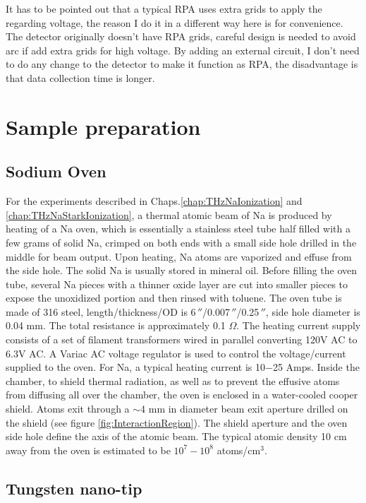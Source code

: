 It has to be pointed out that a typical RPA uses extra grids to apply the regarding voltage, the reason I do it in a different way here is for convenience. The detector originally doesn't have RPA grids, careful design is needed to avoid arc if add extra grids for high voltage. By adding an external circuit, I don't need to do any change to the detector to make it function as RPA, the disadvantage is that data collection time is longer. 

\section{Sample preparation}

\subsection{Sodium Oven}

For the experiments described in Chaps.\@ \ref{chap:THzNaIonization} and \ref{chap:THzNaStarkIonization}, a thermal atomic beam of Na is produced by heating of a Na oven, which is essentially a stainless steel tube half filled with a few grams of solid Na, crimped on both ends with a small side hole drilled in the middle for beam output. Upon heating, Na atoms are vaporized and effuse from the side hole. The solid Na is usually stored in mineral oil. Before filling the oven tube, several Na pieces with a thinner oxide layer are cut into smaller pieces to expose the unoxidized portion and then rinsed with toluene. The oven tube is made of 316 steel, length/thickness/OD is 6$\,''$/0.007$\,''$/0.25$\,''$, side hole diameter is 0.04 mm. The total resistance is approximately 0.1 $\Omega$. The heating current supply consists of a set of filament transformers wired in parallel converting 120V AC to 6.3V AC. A Variac AC voltage regulator is used to control the voltage/current supplied to the oven. For Na, a typical heating current is 10$-$25 Amps. Inside the chamber, to shield thermal radiation, as well as to prevent the effusive atoms from diffusing all over the chamber, the oven is enclosed in a water-cooled cooper shield. Atoms exit through a $\sim$4 mm in diameter beam exit aperture drilled on the shield (see figure \ref{fig:InteractionRegion}). The shield aperture and the oven side hole define the axis of the atomic beam. The typical atomic density 10 cm away from the oven is estimated to be $10^7-10^8$ atoms/cm$^3$.
 
\subsection{Tungsten nano-tip}

